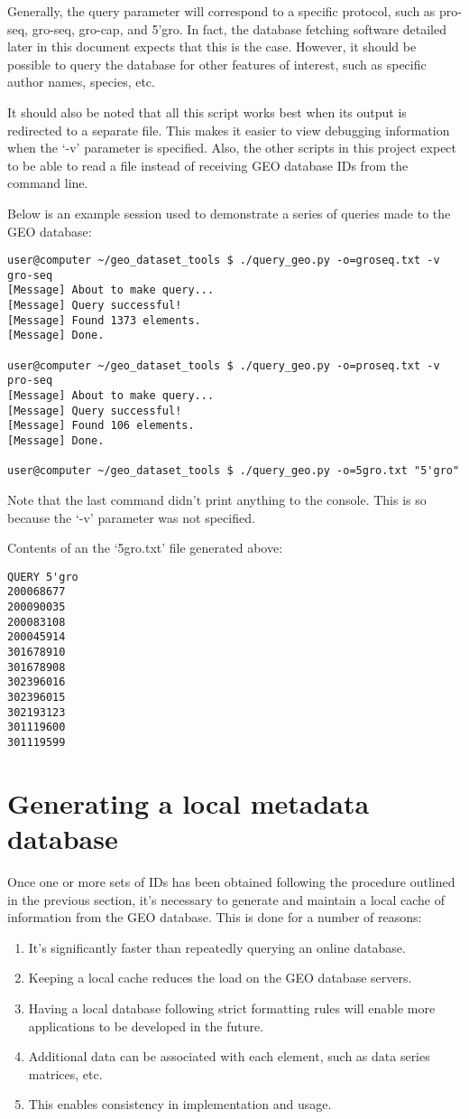 \documentclass[12pt,letterpaper]{article}
\begin{document}
Generally, the query parameter will correspond to a specific protocol, such as pro-seq, gro-seq, gro-cap, and 5'gro. In fact, the 
database fetching software detailed later in this document expects that this is the case. However, it should be possible to 
query the database for other features of interest, such as specific author names, species, etc.

It should also be noted that all this script works best when its output is redirected to a separate file. This makes it easier to view
debugging information when the `-v' parameter is specified. Also, the other scripts in this project expect to be able to read a file instead of
receiving GEO database IDs from the command line. 

Below is an example session used to demonstrate a series of queries made to the GEO database:
\begin{verbatim}
user@computer ~/geo_dataset_tools $ ./query_geo.py -o=groseq.txt -v gro-seq
[Message] About to make query...
[Message] Query successful!
[Message] Found 1373 elements.
[Message] Done.

user@computer ~/geo_dataset_tools $ ./query_geo.py -o=proseq.txt -v pro-seq
[Message] About to make query...
[Message] Query successful!
[Message] Found 106 elements.
[Message] Done.

user@computer ~/geo_dataset_tools $ ./query_geo.py -o=5gro.txt "5'gro"
\end{verbatim}

Note that the last command didn't print anything to the console. This is so because the `-v' parameter was not specified.

Contents of an the `5gro.txt' file generated above:
\begin{verbatim}
QUERY 5'gro
200068677
200090035
200083108
200045914
301678910
301678908
302396016
302396015
302193123
301119600
301119599
\end{verbatim}

\section{Generating a local metadata database}
Once one or more sets of IDs has been obtained following the procedure outlined in the previous section, it's necessary to 
generate and maintain a local cache of information from the GEO database. This is done for a number of reasons:
    
\begin{enumerate}
 \item It's significantly faster than repeatedly querying an online database.
 \item Keeping a local cache reduces the load on the GEO database servers.
 \item Having a local database following strict formatting rules will enable more applications to be developed in the future.
 \item Additional data can be associated with each element, such as data series matrices, etc.
 \item This enables consistency in implementation and usage.
\end{enumerate}
\end{document}
